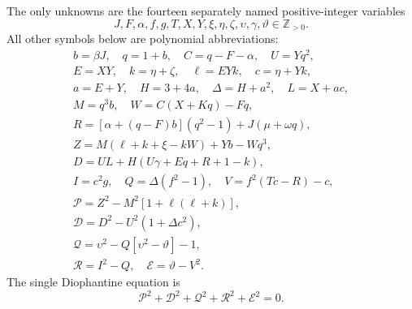 The only unknowns are the fourteen separately named positive-integer variables
\[
J,F,\alpha,f,g,T,X,Y,\xi,\eta,\zeta,\upsilon,\gamma,\vartheta\in\mathbb Z_{>0}.
\]
All other symbols below are polynomial abbreviations:
\[
\begin{gathered}
b=\beta J,\quad q=1+b,\quad C=q-F-\alpha,\quad U=Yq^2,\\
E=XY,\quad k=\eta+\zeta,\quad \ell=EYk,\quad c=\eta+Yk,\\
a=E+Y,\quad H=3+4a,\quad\Delta=H+a^2,\quad L=X+ac,\\
M=q^3b,\quad W=C(X+Kq)-Fq,\\
R=[\alpha+(q-F)b](q^2-1)+J(\mu+\omega q),\\
Z=M(\ell+k+\xi-kW)+Yb-Wq^3,\\
D=UL+H(U\gamma+Eq+R+1-k),\\
I=c^2g,\quad Q=\Delta(f^2-1),\quad V=f^2(Tc-R)-c,\\
\mathcal{P}=Z^2-M^2[1+\ell(\ell+k)],\\
\mathcal{D}=D^2-U^2(1+\Delta c^2),\\
\mathcal{Q}=\upsilon^2-Q[\upsilon^2-\vartheta]-1,\\
\mathcal{R}=I^2-Q,\quad \mathcal{E}=\vartheta-V^2.
\end{gathered}
\]
The single Diophantine equation is
\[
\boxed{\mathcal{P}^2+\mathcal{D}^2+\mathcal{Q}^2+\mathcal{R}^2+\mathcal{E}^2=0.}
\]
